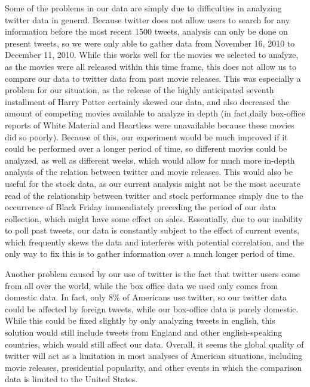 \documentclass[11pt]{article}
\begin{document}
Some of the problems in our data are simply due to difficulties in analyzing twitter data in general.  Because twitter does not allow users to search for any information before the most recent 1500 tweets, analysis can only be done on present tweets, so we were only able to gather data from November 16, 2010 to December 11, 2010.  While this works well for the movies we selected to analyze, as the movies were all released within this time frame, this does not allow us to compare our data to twitter data from past movie releases.  This was especially a problem for our situation, as the release of the highly anticipated seventh installment of Harry Potter certainly skewed our data, and also decreased the amount of competing movies available to analyze in depth (in fact,daily box-office reports of White Material and Heartless were unavailable because these movies did so poorly).  Because of this, our experiment would be much improved if it could be performed over a longer period of time, so different movies could be analyzed, as well as different weeks, which would allow for much more in-depth analysis of the relation between twitter and movie releases.  This would also be useful for the stock data, as our current analysis might not be the most accurate read of the relationship between twitter and stock performance simply due to the occurrence of Black Friday immeadiately preceding the period of our data collection, which might have some effect on sales. Essentially, due to our inability to poll past tweets, our data is constantly subject to the effect of current events, which frequently skews the data and interferes with potential correlation, and the only way to fix this is to gather information over a much longer period of time.

Another problem caused by our use of twitter is the fact that twitter users come from all over the world, while the box office data we used only comes from domestic data.  In fact, only 8\% of Americans use twitter, so our twitter data could be affected by foreign tweets, while our box-office data is purely domestic.  While this could be fixed slightly by only analyzing tweets in english, this solution would still include tweets from England and other english-speaking countries, which would still affect our data.  Overall, it seems the global quality of twitter will act as a limitation in most analyses of American situations, including movie releases, presidential popularity, and other events in which the comparison data is limited to the United States.
	
\end{document}
